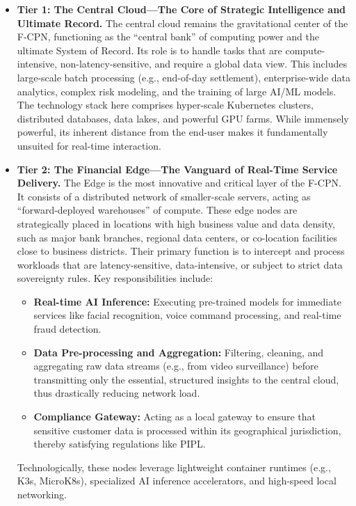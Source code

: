 \documentclass[11pt,a4paper]{article}
\begin{document}
\begin{itemize}
  \item \textbf{Tier 1: The Central Cloud---The Core of Strategic Intelligence and Ultimate Record.} The central cloud remains the gravitational center of the F-CPN, functioning as the ``central bank'' of computing power and the ultimate System of Record. Its role is to handle tasks that are compute-intensive, non-latency-sensitive, and require a global data view. This includes large-scale batch processing (e.g., end-of-day settlement), enterprise-wide data analytics, complex risk modeling, and the training of large AI/ML models. The technology stack here comprises hyper-scale Kubernetes clusters, distributed databases, data lakes, and powerful GPU farms. While immensely powerful, its inherent distance from the end-user makes it fundamentally unsuited for real-time interaction.

  \item \textbf{Tier 2: The Financial Edge---The Vanguard of Real-Time Service Delivery.} The Edge is the most innovative and critical layer of the F-CPN. It consists of a distributed network of smaller-scale servers, acting as ``forward-deployed warehouses'' of compute. These edge nodes are strategically placed in locations with high business value and data density, such as major bank branches, regional data centers, or co-location facilities close to business districts. Their primary function is to intercept and process workloads that are latency-sensitive, data-intensive, or subject to strict data sovereignty rules. Key responsibilities include:
  \begin{itemize}
    \item \textbf{Real-time AI Inference:} Executing pre-trained models for immediate services like facial recognition, voice command processing, and real-time fraud detection.
    \item \textbf{Data Pre-processing and Aggregation:} Filtering, cleaning, and aggregating raw data streams (e.g., from video surveillance) before transmitting only the essential, structured insights to the central cloud, thus drastically reducing network load.
    \item \textbf{Compliance Gateway:} Acting as a local gateway to ensure that sensitive customer data is processed within its geographical jurisdiction, thereby satisfying regulations like PIPL.
  \end{itemize}
  Technologically, these nodes leverage lightweight container runtimes (e.g., K3s, MicroK8s), specialized AI inference accelerators, and high-speed local networking.


\end{itemize}
\end{document}
